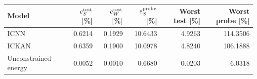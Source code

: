 \begin{tabular}{lrrrrr}
\toprule
Model & $e_S^{\rm test}$ [\%] & $e_W^{\rm test}$ [\%] & $e_S^{\rm probe}$ [\%] & Worst test [\%] & Worst probe [\%] \\
\midrule
ICNN & 0.6214 & 0.1929 & 10.6433 & 4.9263 & 114.3506 \\
ICKAN & 0.6359 & 0.1900 & 10.0978 & 4.8240 & 106.1888 \\
Unconstrained energy & 0.0052 & 0.0010 & 0.6680 & 0.0203 & 6.0318 \\
\bottomrule
\end{tabular}

\par{}
